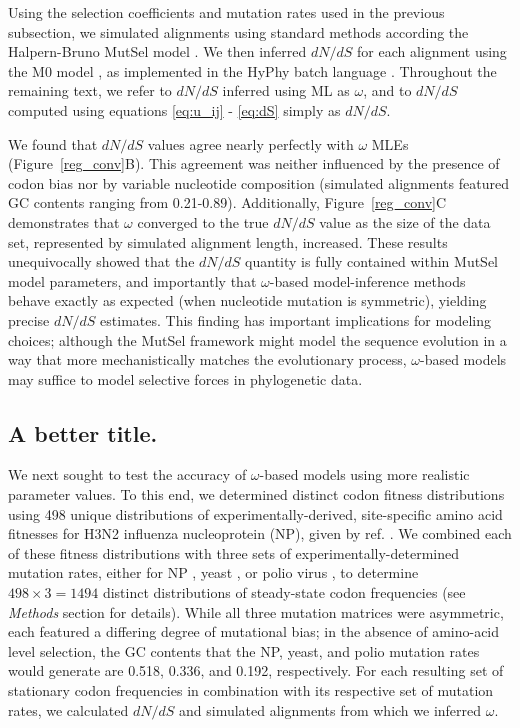 \documentclass[11pt]{article}
\begin{document}
Using the selection coefficients and mutation rates used in the previous subsection, we simulated alignments using standard methods \cite{Yang2006} according the Halpern-Bruno MutSel model \cite{HalpernBruno1998}. We then inferred $dN/dS$ for each alignment using the M0 model \cite{GoldmanYang1994,Yangetal2000}, as implemented in the HyPhy batch language \cite{KosakovskyPondetal2005}. Throughout the remaining text, we refer to $dN/dS$ inferred using ML as $\omega$, and to $dN/dS$ computed using equations \eqref{eq:u_ij} - \eqref{eq:dS} simply as $dN/dS$. 

We found that $dN/dS$ values agree nearly perfectly with $\omega$ MLEs (Figure~\ref{reg_conv}B). This agreement was neither influenced by the presence of codon bias nor by variable nucleotide composition (simulated alignments featured GC contents ranging from 0.21-0.89). Additionally, Figure~\ref{reg_conv}C demonstrates that $\omega$ converged to the true $dN/dS$ value as the size of the data set, represented by simulated alignment length, increased. These results unequivocally showed that the $dN/dS$ quantity is fully contained within MutSel model parameters, and importantly that $\omega$-based model-inference methods behave exactly as expected (when nucleotide mutation is symmetric), yielding precise $dN/dS$ estimates. This finding has important implications for modeling choices; although the MutSel framework might model the sequence evolution in a way that more mechanistically matches the evolutionary process, $\omega$-based models may suffice to model selective forces in phylogenetic data.


\subsection*{A better title.}
We next sought to test the accuracy of $\omega$-based models using more realistic parameter values. To this end, we determined distinct codon fitness distributions using 498 unique distributions of experimentally-derived, site-specific amino acid fitnesses for H3N2 influenza nucleoprotein (NP), given by ref. \cite{Bloom2014a}. We combined each of these fitness distributions with three sets of experimentally-determined mutation rates, either for NP \cite{Bloom2014a}, yeast \cite{Zhu2014}, or polio virus \cite{Acevedo2014}, to determine $498 \times 3 = 1494$ distinct distributions of steady-state codon frequencies (see \emph{Methods} section for details). While all three mutation matrices were asymmetric, each featured a differing degree of mutational bias; in the absence of amino-acid level selection, the GC contents that the NP, yeast, and polio mutation rates would generate are 0.518, 0.336, and 0.192, respectively. For each resulting set of stationary codon frequencies in combination with its respective set of mutation rates, we calculated $dN/dS$ and simulated alignments from which we inferred $\omega$.
\end{document}

